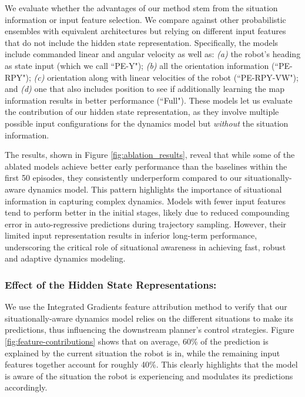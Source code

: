 \documentclass[Afour,sageh,times]{sagej}
\theoremstyle{lemma}
\begin{document}
We evaluate whether the advantages of our method stem from the situation information or input feature selection. We compare against other probabilistic ensembles with equivalent architectures but relying on different input features that do not include the hidden state representation. Specifically, the models include commanded linear and angular velocity as well as: \textit{(a)} the robot's heading as state input (which we call ``PE-Y"); \textit{(b)} all the orientation information (``PE-RPY"); \textit{(c)} orientation along with linear velocities of the robot (``PE-RPY-VW"); and \textit{(d)} one that also includes position to see if additionally learning the map information results in better performance (``Full"). These models let us evaluate the contribution of our hidden state representation, as they involve multiple possible input configurations for the dynamics model but \textit{without} the situation information. 

The results, shown in Figure \ref{fig:ablation_results}, reveal that while some of the ablated models achieve better early performance than the baselines within the first 50 episodes, they consistently underperform compared to our situationally-aware dynamics model. 
This pattern highlights the importance of situational information in capturing complex dynamics. Models with fewer input features tend to perform better in the initial stages, likely due to reduced compounding error in auto-regressive predictions during trajectory sampling. However, their limited input representation results in inferior long-term performance, underscoring the critical role of situational awareness in achieving fast, robust and adaptive dynamics modeling.

\subsubsection{Effect of the Hidden State Representations:}

We use the Integrated Gradients \cite[]{integrated_gradients} feature attribution method to verify that our situationally-aware dynamics model relies on the different situations to make its predictions, thus influencing the downstream planner's control strategies. Figure \ref{fig:feature-contributions} shows that on average, 60\% of the prediction is explained by the current situation the robot is in, while the remaining input features together account for roughly 40\%. This clearly highlights that the model is aware of the situation the robot is experiencing and modulates its predictions accordingly.
\end{document}
